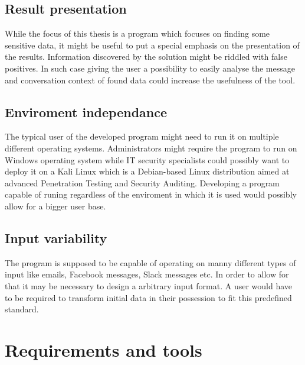 \documentclass[a4paper,twoside,12pt]{book}
\begin{document}
\section{Result presentation}

While the focus of this thesis is a program which focuses on finding some sensitive data, it might be useful to put a special emphasis on the
presentation of the results. Information discovered by the solution might be riddled with false positives. In such case giving the user a possibility
to easily analyse the message and conversation context of found data could increase the usefulness of the tool. 

\section{Enviroment independance}

The typical user of the developed program might need to run it on multiple different operating systems. Administrators might require the program to run
on Windows operating system while IT security specialists could possibly want to deploy it on a Kali Linux which is a Debian-based Linux distribution 
aimed at advanced Penetration Testing and Security Auditing. Developing a program capable of runing regardless of the enviroment in which it is used would possibly
allow for a bigger user base.

\section{Input variability}

The program is supposed to be capable of operating on manny different types of input like emails, Facebook messages, Slack messages etc. In order to 
allow for that it may be necessary to design a arbitrary input format. A user would have to be required to transform initial data in their possession to 
fit this predefined standard. 

\chapter{Requirements and tools}
\end{document}
